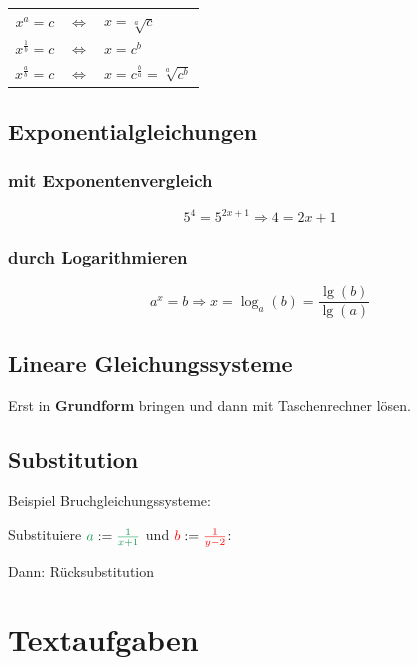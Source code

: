 \begin{multicols}{2}
\begin{tabular}{rcl}
$x^a=c$ & $\Leftrightarrow$ & $x=\sqrt[a]{c}$\\
$x^\frac1b=c$&$\Leftrightarrow$&$x=c^b$\\
$x^{\frac{a}b} = c$&$\Leftrightarrow{}$&$x=c^{\frac{b}a} = \sqrt[a]{c^b}$
\end{tabular}

\subsection*{Exponentialgleichungen}
\subsubsection*{mit Exponentenvergleich}

$$5^4 = 5^{2x+1} \Longrightarrow  4=2x+1$$

\subsubsection*{durch Logarithmieren}
$$a^x=b \Rightarrow{} x=\log_a(b) = \frac{\lg(b)}{\lg(a)}$$


\forceCB


\subsection*{Lineare Gleichungssysteme}
Erst in \textbf{Grundform} bringen und dann
mit Taschenrechner lösen.

\subsection*{Substitution}
Beispiel Bruchgleichungssysteme:

Substituiere
${\color{ForestGreen}a}:={\color{ForestGreen}\frac1{x+1}}$ und
${\color{red}b} : ={\color{red}\frac1{y-2}}$:


Dann: Rücksubstitution


\forceCB

\section*{Textaufgaben}

\end{multicols}
